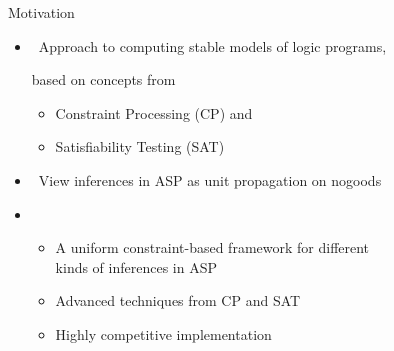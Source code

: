 \begin{frame}{Motivation}
  \bigskip
  \begin{itemize}
  \item<1-> \ Approach to computing stable models of logic programs,

    based on concepts from
    \begin{itemize}\normalsize
    \item Constraint Processing (CP) and
    \item Satisfiability Testing (SAT)
    \end{itemize}
    \medskip
  \item<1-> \ View inferences in ASP as unit propagation on nogoods
    \medskip
  \item<1->
    \begin{itemize}\normalsize
    \item A uniform constraint-based framework for different\\ kinds of
      inferences in ASP
    \item Advanced techniques from CP and SAT
    \item Highly competitive implementation
    \end{itemize}
  \end{itemize}
\end{frame}
%
